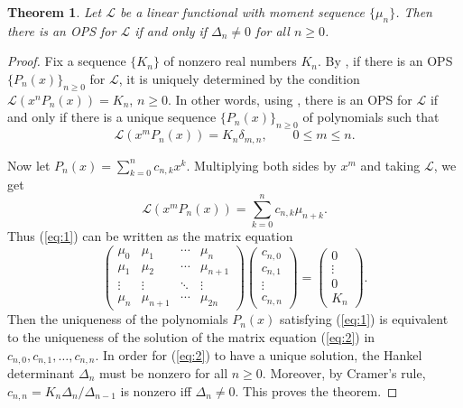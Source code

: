 \documentclass{amsart}
\numberwithin{equation}{section}
\newtheorem{thm}{Theorem}[section]
\theoremstyle{definition}
\newcommand\LL{\mathcal{L}}
\begin{document}
\begin{thm}\label{thm:Dne0}
  Let \( \LL \) be a linear functional with moment sequence
  \( \{\mu_n\} \).
  Then there is an OPS for \( \LL \) if and only if
  \( \Delta_n\ne 0 \) for all \( n\ge0 \).
\end{thm}

\begin{proof}
  Fix a sequence \( \{K_n\} \) of nonzero real numbers \( K_n \). By
  , if there is an OPS
  \( \{ P_n(x) \}_{n\ge 0} \) for \( \LL \), it is uniquely determined
  by the condition \( \LL(x^n P_n(x)) = K_n \), \( n\ge0 \). In other
  words, using , there is an OPS for \( \LL \) if
  and only if there is a unique sequence \( \{ P_n(x) \}_{n\ge 0} \)
  of polynomials such that
  \begin{equation}\label{eq:1}
    \LL(x^mP_n(x)) = K_n \delta_{m,n}, \qquad 0\le m\le n.
  \end{equation}
  
  Now let \( P_n(x) = \sum_{k=0}^{n} c_{n,k} x^k \). Multiplying both
  sides by \( x^m \) and taking \( \LL \), we get
  \[
    \LL(x^mP_n(x)) = \sum_{k=0}^{n} c_{n,k} \mu_{n+k}.
  \]
  Thus (\ref{eq:1}) can be written as the matrix equation
  \begin{equation}\label{eq:2}
   \begin{pmatrix}
     \mu_0 & \mu_1 & \cdots & \mu_n\\
     \mu_1 & \mu_2 & \cdots & \mu_{n+1}\\
     \vdots & \vdots & \ddots & \vdots\\
     \mu_n & \mu_{n+1} & \cdots & \mu_{2n}
   \end{pmatrix}
\begin{pmatrix}
c_{n,0} \\ c_{n,1} \\ \vdots \\ c_{n,n}
\end{pmatrix} 
= \begin{pmatrix}
0 \\ \vdots \\ 0 \\ K_n
\end{pmatrix}. 
  \end{equation}
  Then the uniqueness of the polynomials \( P_n(x) \) satisfying
  (\ref{eq:1}) is equivalent to the uniqueness of the solution of the
  matrix equation (\ref{eq:2}) in \( c_{n,0},c_{n,1},\dots,c_{n,n} \).
  In order for (\ref{eq:2}) to have a unique solution, the Hankel
  determinant \( \Delta_n \) must be nonzero for all \( n\ge0 \).
  Moreover, by Cramer's rule, \( c_{n,n} = K_n\Delta_n/\Delta_{n-1} \)
  is nonzero iff \( \Delta_n\ne 0 \). This proves the theorem.
\end{proof}
\end{document}
